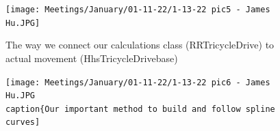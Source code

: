 \begin{figure}[htp]
\centering
\texttt{[image: Meetings/January/01-11-22/1-13-22 pic5 - James Hu.JPG]}
\caption{The way we connect our calculations class (RRTricycleDrive) to actual movement (HhsTricycleDrivebase)}
\label{fig:011322_5}
\end{figure}

\begin{figure}[htp]
\centering
\texttt{[image: Meetings/January/01-11-22/1-13-22 pic6 - James Hu.JPG
\\caption\{Our important method to build and follow spline curves]}
\label{fig:011322_6}
\end{figure}






